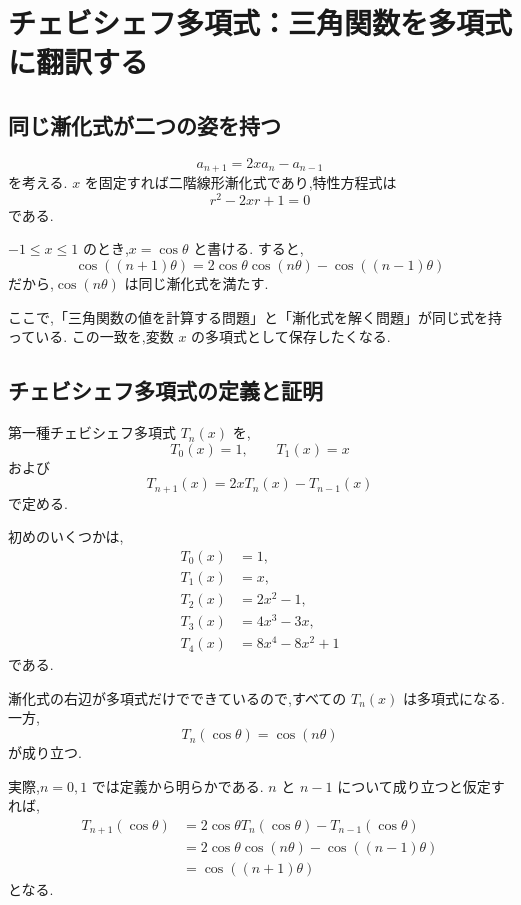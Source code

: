 
\section{チェビシェフ多項式：三角関数を多項式に翻訳する}

\subsection{同じ漸化式が二つの姿を持つ}

\[
  a_{n+1}=2x a_n-a_{n-1}
\]
を考える.
$x$ を固定すれば二階線形漸化式であり,特性方程式は
\[
  r^2-2xr+1=0
\]
である.

$-1\leq x\leq1$ のとき,$x=\cos\theta$ と書ける.
すると,
\[
  \cos((n+1)\theta)
  =
  2\cos\theta\cos(n\theta)-\cos((n-1)\theta)
\]
だから,$\cos(n\theta)$ は同じ漸化式を満たす.

ここで,「三角関数の値を計算する問題」と「漸化式を解く問題」が同じ式を持っている.
この一致を,変数 $x$ の多項式として保存したくなる.

\subsection{チェビシェフ多項式の定義と証明}

第一種チェビシェフ多項式 $T_n(x)$ を,
\[
  T_0(x)=1,\qquad T_1(x)=x
\]
および
\[
  T_{n+1}(x)=2xT_n(x)-T_{n-1}(x)
\]
で定める.

初めのいくつかは,
\[
  \begin{aligned}
    T_0(x) & =1,          \\
    T_1(x) & =x,          \\
    T_2(x) & =2x^2-1,     \\
    T_3(x) & =4x^3-3x,    \\
    T_4(x) & =8x^4-8x^2+1
  \end{aligned}
\]
である.

漸化式の右辺が多項式だけでできているので,すべての $T_n(x)$ は多項式になる.
一方,
\[
  T_n(\cos\theta)=\cos(n\theta)
\]
が成り立つ.

実際,$n=0,1$ では定義から明らかである.
$n$ と $n-1$ について成り立つと仮定すれば,
\[
  \begin{aligned}
    T_{n+1}(\cos\theta)
     & =2\cos\theta T_n(\cos\theta)-T_{n-1}(\cos\theta) \\
     & =2\cos\theta\cos(n\theta)-\cos((n-1)\theta)      \\
     & =\cos((n+1)\theta)
  \end{aligned}
\]
となる.


